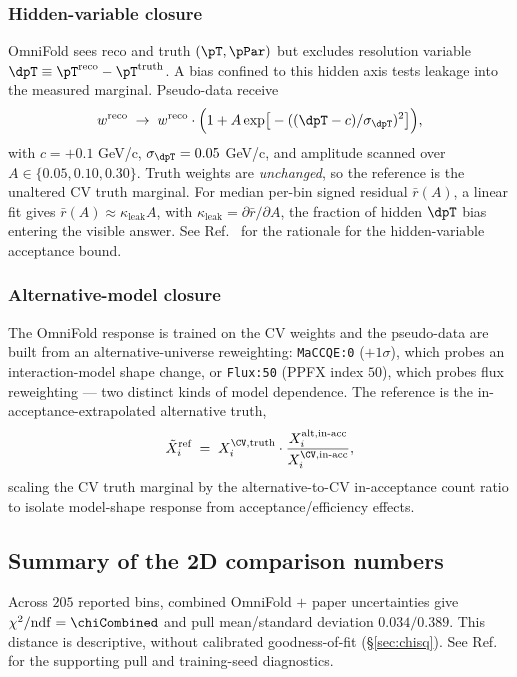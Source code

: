 \subsubsection{Hidden-variable closure}
\label{sec:closure-hv}
OmniFold sees reco and truth $(\pT,\pPar)$ but excludes resolution variable $\dpT \equiv \pT^{\text{reco}}-\pT^{\text{truth}}$. A bias confined to this hidden axis tests leakage into the measured marginal. Pseudo-data receive
\begin{equation}
w^{\text{reco}}
\;\to\;
w^{\text{reco}}\cdot
\Big(1 + A\exp\!\big[-((\dpT - c)/\sigma_{\dpT})^{2}\big]\Big),
\end{equation}
with $c=+0.1$ GeV/c, $\sigma_{\dpT}=0.05$ GeV/c, and amplitude scanned over $A\in\{0.05,0.10,0.30\}$. Truth weights are \emph{unchanged}, so the reference is the unaltered CV truth marginal. For median per-bin signed residual $\bar r(A)$, a linear fit gives $\bar r(A) \approx \kappa_{\text{leak}} A$, with $\kappa_{\text{leak}} = \partial \bar r/\partial A$, the fraction of hidden $\dpT$ bias entering the visible answer. See Ref.~\cite{NoteRecords2026} for the rationale for the hidden-variable acceptance bound.

\subsubsection{Alternative-model closure}
\label{sec:closure-alt}
The OmniFold response is trained on the CV weights and the pseudo-data are built from an alternative-universe reweighting: \texttt{MaCCQE:0} ($+1\sigma$), which probes an interaction-model shape change, or \texttt{Flux:50} (PPFX index $50$), which probes flux reweighting --- two distinct kinds of model dependence. The reference is the in-acceptance-extrapolated alternative truth,
\begin{equation}
\tilde X^{\text{ref}}_{i}
\;=\;
X^{\CV,\text{truth}}_{i}\cdot
\frac{X^{\text{alt},\text{in-acc}}_{i}}{X^{\CV,\text{in-acc}}_{i}},
\end{equation}
scaling the CV truth marginal by the alternative-to-CV in-acceptance count ratio to isolate model-shape response from acceptance/efficiency effects.

\subsection{Summary of the 2D comparison numbers}
\label{sec:assemble}

Across $205$ reported bins, combined OmniFold $+$ paper uncertainties give $\chi^{2}/\mathrm{ndf} = \chiCombined$ and pull mean/standard deviation $0.034/0.389$. This distance is descriptive, without calibrated goodness-of-fit (\S\ref{sec:chisq}). See Ref.~\cite{NoteRecords2026} for the supporting pull and training-seed diagnostics. 



